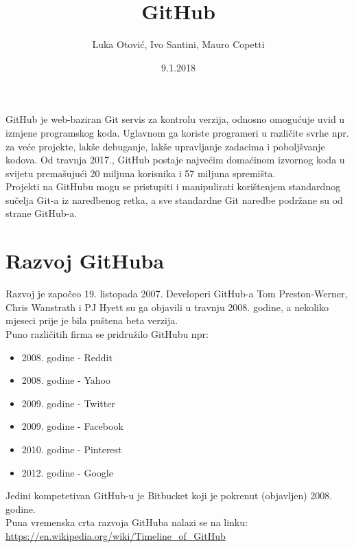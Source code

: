 \documentclass{article}
\title{GitHub}
\date{9.1.2018}
\author{Luka Otović, Ivo Santini, Mauro Copetti}
\begin{document}
	\maketitle
	\newpage
	\tableofcontents
	\newpage

	GitHub je web-baziran Git servis za kontrolu verzija, odnosno omogućuje uvid u izmjene programskog koda. Uglavnom ga koriste programeri u različite svrhe npr. za veće projekte,
	lakše debuganje, lakše upravljanje zadacima i poboljšvanje kodova. Od travnja 2017., GitHub postaje najvećim domaćinom izvornog koda u svijetu premašujući
	20 miljuna korisnika i 57 miljuna spremišta.
	\\
	Projekti na GitHubu mogu se pristupiti i manipulirati korištenjem standardnog sučelja Git-a iz naredbenog retka, a sve standardne
	Git naredbe podržane su od strane GitHub-a.

	\section{\textbf {Razvoj GitHuba}}
		Razvoj je započeo 19. listopada 2007. Developeri GitHub-a Tom Preston-Werner, Chris Wanstrath i PJ Hyett su ga objavili
		u travnju 2008. godine, a nekoliko mjeseci prije je bila puštena beta verzija.\\
		Puno različitih firma se pridružilo GitHubu npr:
		\begin{itemize}
			\item 2008. godine - Reddit
			\item 2008. godine - Yahoo
			\item 2009. godine - Twitter
			\item 2009. godine - Facebook
			\item 2010. godine - Pinterest
			\item 2012. godine - Google
		\end{itemize}
	
		Jedini kompetetivan GitHub-u je Bitbucket koji je pokrenut (objavljen) 2008. godine.
		\\
		Puna vremenska crta razvoja GitHuba nalazi se na linku:\\
		\url{https://en.wikipedia.org/wiki/Timeline_of_GitHub}
		\\
		\\
\end{document}
